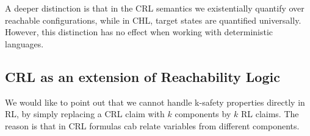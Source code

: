 A deeper distinction is that in the CRL semantics we existentially quantify
over reachable configurations, while in CHL, target states are quantified
universally. However, this distinction has no effect when working with
deterministic languages.

\subsection{CRL as an extension of Reachability Logic}

We would like to point out that we cannot  handle k-safety properties directly
in RL, by simply replacing a CRL claim with $k$ components by $k$ RL
claims. The reason is that in CRL formulas cab relate variables from different components. 


